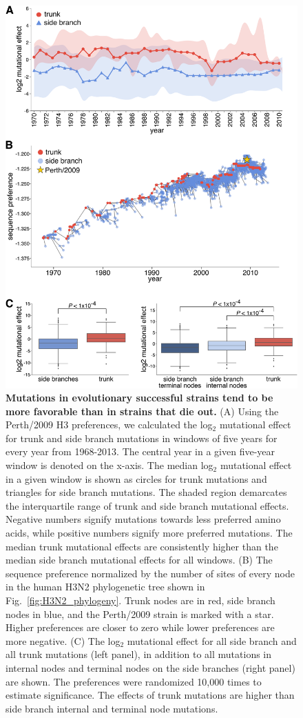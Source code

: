 \documentclass[9pt,twocolumn,twoside]{pnas-new}
\begin{document}
\begin{figure}
\centering
\includegraphics[width=11.4cm]{figs/trunkvssidebranch/trunkvssidebranch.pdf}
\caption{\label{fig:trunkvssidebranch}
{\bf Mutations in evolutionary successful strains tend to be more favorable than in strains that die out.}
(A) Using the Perth/2009 H3 preferences, we calculated the log$_{2}$ mutational effect for trunk and side branch mutations in windows of five years for every year from 1968-2013. 
The central year in a given five-year window is denoted on the x-axis.
The median log$_{2}$ mutational effect in a given window is shown as circles for trunk mutations and triangles for side branch mutations. 
The shaded region demarcates the interquartile range of trunk and side branch mutational effects.
Negative numbers signify mutations towards less preferred amino acids, while positive numbers signify more preferred mutations.
The median trunk mutational effects are consistently higher than the median side branch mutational effects for all windows.
(B) The sequence preference normalized by the number of sites of every node in the human H3N2 phylogenetic tree shown in Fig.~\ref{fig:H3N2_phylogeny}.
Trunk nodes are in red, side branch nodes in blue, and the Perth/2009 strain is marked with a star.
Higher preferences are closer to zero while lower preferences are more negative.
(C) The log$_{2}$ mutational effect for all side branch and all trunk mutations (left panel), in addition to all mutations in internal nodes and terminal nodes on the side branches (right panel) are shown.
The preferences were randomized 10,000 times to estimate significance.
The effects of trunk mutations are higher than side branch internal and terminal node mutations.
}
\end{figure}
\end{document}
